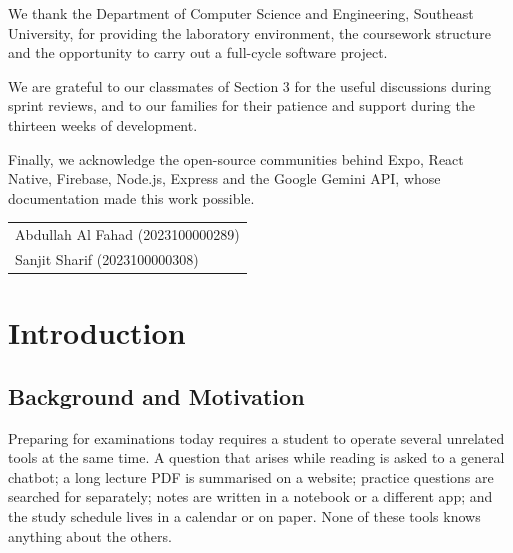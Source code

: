 \documentclass[12pt,a4paper,oneside]{report}
\begin{document}
We thank the Department of Computer Science and Engineering, Southeast University,
for providing the laboratory environment, the coursework structure and the
opportunity to carry out a full-cycle software project.

We are grateful to our classmates of Section 3 for the useful discussions during
sprint reviews, and to our families for their patience and support during the
thirteen weeks of development.

Finally, we acknowledge the open-source communities behind Expo, React Native,
Firebase, Node.js, Express and the Google Gemini API, whose documentation made this
work possible.

\vspace{10pt}
\begin{flushright}
\begin{tabular}{l}
Abdullah Al Fahad (2023100000289)\\
Sanjit Sharif (2023100000308)\\
\end{tabular}
\end{flushright}

\tableofcontents
\listoffigures
{}
\listoftables
{}

\clearpage
{}
\pagestyle{fancy}
\setcounter{page}{1}

\chapter{Introduction}

\section{Background and Motivation}

Preparing for examinations today requires a student to operate several unrelated
tools at the same time. A question that arises while reading is asked to a general
chatbot; a long lecture PDF is summarised on a website; practice questions are
searched for separately; notes are written in a notebook or a different app; and the
study schedule lives in a calendar or on paper. None of these tools knows anything
about the others.
\end{document}

